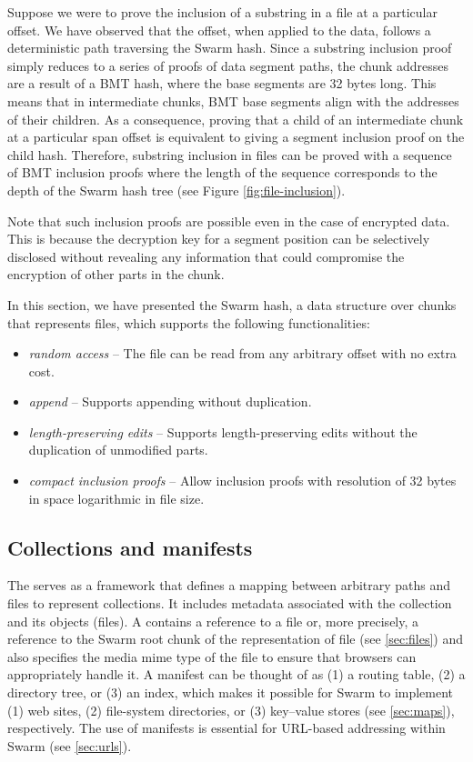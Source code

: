 Suppose we were to prove the inclusion of a substring in a file at a particular offset. We have observed that the offset, when applied to the data, follows a deterministic path traversing the Swarm hash. Since a substring inclusion proof simply reduces to a series of proofs of data segment paths, the chunk addresses are a result of a BMT hash, where the base segments are 32 bytes long. This means that in intermediate chunks, BMT base segments align with the addresses of their children. As a consequence, proving that a child of an intermediate chunk at a particular span offset is equivalent to giving a segment inclusion proof on the child hash. Therefore, substring inclusion in files can be proved with a sequence of BMT inclusion proofs where the length of the sequence corresponds to the depth of the Swarm hash tree (see Figure \ref{fig:file-inclusion}). 


Note that such inclusion proofs are possible even in the case of encrypted data. This is because the decryption key for a segment position can be selectively disclosed without revealing any information that could compromise the encryption of other parts in the chunk.

In this section, we have presented the Swarm hash, a data structure over chunks that represents files, which supports the following functionalities:

\begin{itemize}[noitemsep]
    \item \emph{random access} -- The file can be read from any arbitrary offset with no extra cost.
    \item \emph{append} -- Supports appending without duplication. 
    \item \emph{length-preserving edits} -- Supports length-preserving edits without the duplication of unmodified parts.
    \item \emph{compact inclusion proofs} -- Allow inclusion proofs with resolution of 32 bytes in space logarithmic in file size.
\end{itemize}



\subsection{Collections and manifests\statusgreen}\label{sec:collections}

The  serves as a framework that defines a mapping between arbitrary paths and files to represent collections. It includes metadata associated with the collection and its objects (files). A  contains a reference to a file or, more precisely, a reference to the Swarm root chunk of the representation of file (see \ref{sec:files}) and also specifies the media mime type of the file to ensure that browsers can appropriately handle it. A manifest can be thought of as (1) a routing table, (2) a directory tree, or  (3) an index, which makes it possible for Swarm to implement (1) web sites, (2) file-system directories, or (3) key--value stores (see \ref{sec:maps}), respectively. The use of manifests is essential for URL-based addressing within Swarm (see \ref{sec:urls}). 


